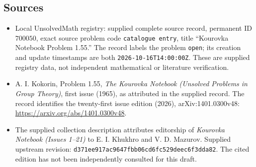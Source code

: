 \documentclass[11pt]{article}
\begin{document}
\subsection{Sources}
\begin{itemize}
\item Local UnsolvedMath registry: supplied complete source record, permanent ID \(700050\), exact source problem code \texttt{catalogue entry}, title ``Kourovka Notebook Problem 1.55.'' The record labels the problem \texttt{open}; its creation and update timestamps are both \texttt{2026-10-16T14:00:00Z}. These are supplied registry data, not independent mathematical or literature verification.
\item A. I. Kokorin, Problem 1.55, \emph{The Kourovka Notebook (Unsolved Problems in Group Theory)}, first issue (1965), as attributed in the supplied record. The record identifies the twenty-first issue edition (2026), arXiv:1401.0300v48: \url{https://arxiv.org/abs/1401.0300v48}.
\item The supplied collection description attributes editorship of \emph{Kourovka Notebook (Issues 1--21)} to E. I. Khukhro and V. D. Mazurov. Supplied upstream revision: \texttt{d371ee917ac9647fbb06cd6fc529deec6f3dda82}. The cited edition has not been independently consulted for this draft.
\end{itemize}
\end{document}
